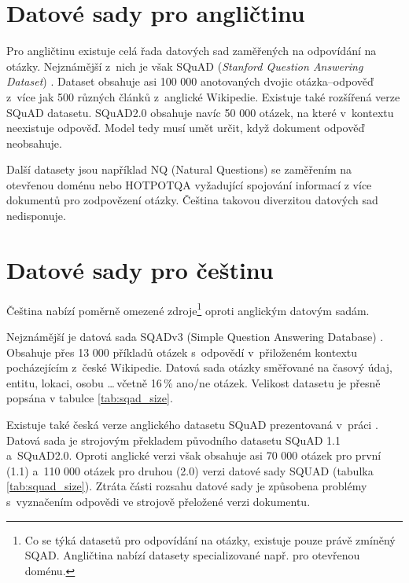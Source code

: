 \section{Datové sady pro angličtinu}
Pro angličtinu existuje celá řada datových sad zaměřených na odpovídání na otázky. Nejznámější z~nich je však SQuAD (\emph{Stanford Question Answering Dataset}) \cite{squad}. Dataset obsahuje asi 100 000 anotovaných dvojic otázka--odpověď z~více jak 500 různých článků z~anglické Wikipedie. Existuje také rozšířená verze SQuAD datasetu. SQuAD2.0 \cite{squad_v2} obsahuje navíc 50 000 otázek, na které v~kontextu neexistuje odpověď. Model tedy musí umět určit, když dokument odpověď neobsahuje.\par
Další datasety jsou například NQ (Natural Questions) se zaměřením na otevřenou doménu nebo HOTPOTQA vyžadující spojování informací z více dokumentů pro zodpovězení otázky. Čeština takovou diverzitou datových sad nedisponuje.

\section{Datové sady pro češtinu}
Čeština nabízí poměrně omezené zdroje\footnote{Co se týká datasetů pro odpovídání na otázky, existuje pouze právě zmíněný SQAD. Angličtina nabízí datasety specializované např. pro otevřenou doménu.} oproti anglickým datovým sadám.\par 
Nejznámější je datová sada SQADv3 (Simple Question Answering Database) \cite{sqad}. Obsahuje přes 13 000 příkladů otázek s~odpovědí v~přiloženém kontextu pocházejícím z~české Wikipedie. Datová sada otázky směřované na časový údaj, entitu, lokaci, osobu \dots \,včetně 16\,\% ano/ne otázek. Velikost datasetu je přesně popsána v tabulce \ref{tab:sqad_size}.\par
Existuje také česká verze anglického datasetu SQuAD prezentovaná v~práci \cite{czech_squad}. Datová sada je strojovým překladem původního datasetu SQuAD 1.1 a~SQuAD2.0. Oproti anglické verzi však obsahuje asi 70 000 otázek pro první (1.1) a~110 000 otázek pro druhou (2.0) verzi datové sady SQUAD (tabulka \ref{tab:squad_size}). Ztráta části rozsahu datové sady je způsobena problémy s~vyznačením odpovědi ve strojově přeložené verzi dokumentu.


